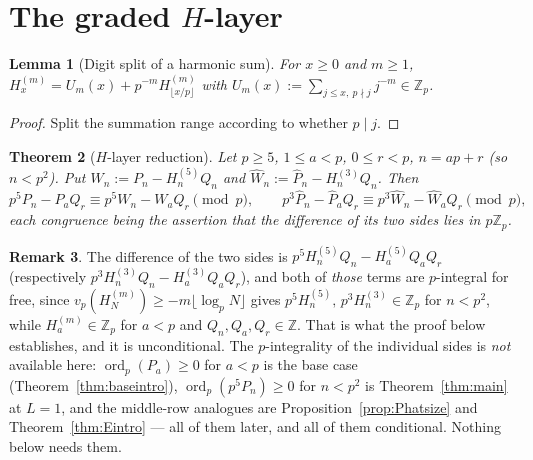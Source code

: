 \documentclass[11pt,reqno]{amsart}
\theoremstyle{plain}
\newtheorem{theorem}{Theorem}[section]
\newtheorem{lemma}[theorem]{Lemma}
\theoremstyle{definition}
\newtheorem{remark}[theorem]{Remark}
\theoremstyle{remark}
\numberwithin{equation}{section}
\newcommand{\ZZ}{\mathbb{Z}}
\newcommand{\Zp}{\ZZ_p}
\newcommand{\ord}{\operatorname{ord}}
\begin{document}
\section{The graded \texorpdfstring{$H$}{H}-layer}\label{sec:Hlayer}

\begin{lemma}[Digit split of a harmonic sum]\label{lem:H}
For $x\ge0$ and $m\ge1$,
$H^{(m)}_x=U_m(x)+p^{-m}H^{(m)}_{\lfloor x/p\rfloor}$ with
$U_m(x):=\sum_{j\le x,\ p\nmid j}j^{-m}\in\Zp$.
\end{lemma}

\begin{proof}
Split the summation range according to whether $p\mid j$.
\end{proof}

\begin{theorem}[$H$-layer reduction]\label{thm:C}
Let $p\ge5$, $1\le a<p$, $0\le r<p$, $n=ap+r$ \textup{(}so $n<p^2$\textup{)}. Put
$W_n:=P_n-H^{(5)}_nQ_n$ and $\hat W_n:=\hat P_n-H^{(3)}_nQ_n$. Then
\[
p^5P_n-P_aQ_r\equiv p^5W_n-W_aQ_r\pmod p,\qquad
p^3\hat P_n-\hat P_aQ_r\equiv p^3\hat W_n-\hat W_aQ_r\pmod p,
\]
each congruence being the assertion that the difference of its two sides lies in $p\Zp$.
\end{theorem}

\begin{remark}
The difference of the two sides is $p^5H^{(5)}_nQ_n-H^{(5)}_aQ_aQ_r$ (respectively
$p^3H^{(3)}_nQ_n-H^{(3)}_aQ_aQ_r$), and both of \emph{those} terms are $p$-integral for free,
since $v_p(H^{(m)}_N)\ge-m\lfloor\log_pN\rfloor$ gives $p^5H^{(5)}_n,\,p^3H^{(3)}_n\in\Zp$ for
$n<p^2$, while $H^{(m)}_a\in\Zp$ for $a<p$ and $Q_n,Q_a,Q_r\in\ZZ$. That is what the proof
below establishes, and it is unconditional. The $p$-integrality of the individual sides is
\emph{not} available here: $\ord_p(P_a)\ge0$ for $a<p$ is the base case
(Theorem~\ref{thm:baseintro}), $\ord_p(p^5P_n)\ge0$ for $n<p^2$ is Theorem~\ref{thm:main} at
$L=1$, and the middle-row analogues are Proposition~\ref{prop:Phatsize} and
Theorem~\ref{thm:Eintro} --- all of them later, and all of them conditional. Nothing below
needs them.
\end{remark}
\end{document}
